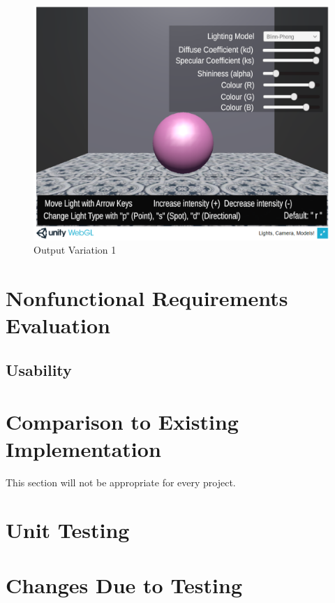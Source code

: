 \documentclass[12pt, titlepage]{article}
\begin{document}
\begin{enumerate}
	\begin{figure}[h]
		\centering
		\includegraphics[scale=0.25]{./images/fromVnVPlan/sphere-lit-direction}
		\caption{Output Variation 1}
		\label{fig:directional}
	\end{figure}	
	
	
\end{enumerate}

\section{Nonfunctional Requirements Evaluation}

\subsection{Usability}

\section{Comparison to Existing Implementation}	

This section will not be appropriate for every project.

\section{Unit Testing}

\section{Changes Due to Testing}
\end{document}
